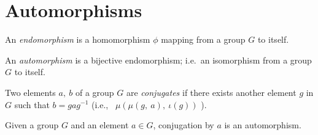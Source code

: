 \section{Automorphisms}

\begin{definition}[Endomorphism]
    \label{definition : Endomorphism}
    \leanok
    An \emph{endomorphism} is a homomorphism \( \phi \) mapping from a group \( G \) to itself.
\end{definition}

\begin{definition}[Automorphism]
    \label{definition : Automorphism}
    \leanok
    An \emph{automorphism} is a bijective endomorphism; i.e.~an isomorphism
    from a group \( G \) to itself.
\end{definition}

\begin{definition}[Conjugate]
    \label{definition : Conjugate}
    \leanok
    Two elements \( a,~b \) of a group \( G \) are \emph{conjugates} if there
    exists another element \( g \) in \( G \) such that \( b = gag^{-1} \) (i.e.,~ \(
    \mu(\mu(g,~a),~\iota(g)) \) ).
\end{definition}

\begin{theorem}
    \label{theorem : conj_automorphism}
    \leanok
    Given a group \( G \) and an element \( a \in G \), conjugation by \( a \)
    is an automorphism.
\end{theorem}

